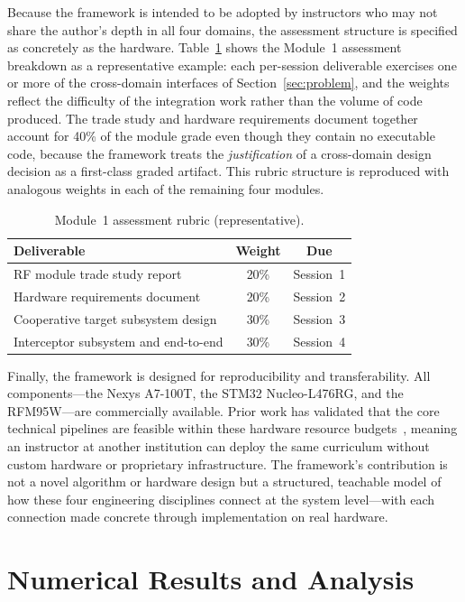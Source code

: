 \documentclass[conference]{IEEEtran}
\begin{document}
Because the framework is intended to be adopted by instructors who may not share the author's depth in all four domains, the assessment structure is specified as concretely as the hardware. Table~\ref{tab:rubric} shows the Module~1 assessment breakdown as a representative example: each per-session deliverable exercises one or more of the cross-domain interfaces of Section~\ref{sec:problem}, and the weights reflect the difficulty of the integration work rather than the volume of code produced. The trade study and hardware requirements document together account for 40\% of the module grade even though they contain no executable code, because the framework treats the \emph{justification} of a cross-domain design decision as a first-class graded artifact. This rubric structure is reproduced with analogous weights in each of the remaining four modules.

\begin{table}[t]
\centering
\caption{Module~1 assessment rubric (representative).}
\label{tab:rubric}
\begin{tabular}{l c c}
\toprule
\textbf{Deliverable} & \textbf{Weight} & \textbf{Due} \\
\midrule
RF module trade study report        & 20\% & Session~1 \\
Hardware requirements document      & 20\% & Session~2 \\
Cooperative target subsystem design & 30\% & Session~3 \\
Interceptor subsystem and end-to-end & 30\% & Session~4 \\
\bottomrule
\end{tabular}
\end{table}

Finally, the framework is designed for reproducibility and transferability. All components---the Nexys A7-100T, the STM32 Nucleo-L476RG, and the RFM95W---are commercially available. Prior work has validated that the core technical pipelines are feasible within these hardware resource budgets~\cite{b1,b3,b7}, meaning an instructor at another institution can deploy the same curriculum without custom hardware or proprietary infrastructure. The framework's contribution is not a novel algorithm or hardware design but a structured, teachable model of how these four engineering disciplines connect at the system level---with each connection made concrete through implementation on real hardware. %

\section{Numerical Results and Analysis}\label{sec:results}
\end{document}
